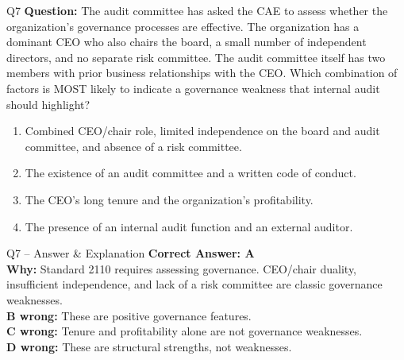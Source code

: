 \documentclass[aspectratio=169,10pt]{beamer}
\begin{document}
	\begin{frame}[t]{Q7}
		\small
		\textbf{Question:} The audit committee has asked the CAE to assess whether the organization's governance processes are effective. The organization has a dominant CEO who also chairs the board, a small number of independent directors, and no separate risk committee. The audit committee itself has two members with prior business relationships with the CEO. Which combination of factors is MOST likely to indicate a governance weakness that internal audit should highlight?
		\begin{enumerate}[label=\Alph*.,itemsep=1pt,topsep=2pt]
			\item Combined CEO/chair role, limited independence on the board and audit committee, and absence of a risk committee.
			\item The existence of an audit committee and a written code of conduct.
			\item The CEO's long tenure and the organization's profitability.
			\item The presence of an internal audit function and an external auditor.
		\end{enumerate}
	\end{frame}
	
	\begin{frame}[t]{Q7 -- Answer \& Explanation}
		\small
		\textbf{Correct Answer: A} \\[4pt]
		\textbf{Why:} Standard 2110 requires assessing governance. CEO/chair duality, insufficient independence, and lack of a risk committee are classic governance weaknesses. \\[4pt]
		\textbf{B wrong:} These are positive governance features. \\[2pt]
		\textbf{C wrong:} Tenure and profitability alone are not governance weaknesses. \\[2pt]
		\textbf{D wrong:} These are structural strengths, not weaknesses.
	\end{frame}
	
\end{document}
